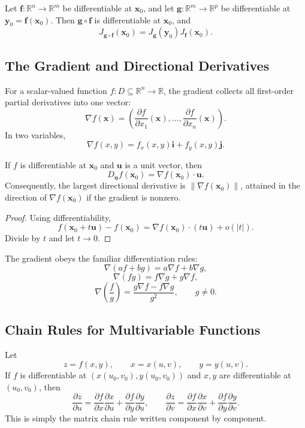 \begin{theorem}
Let $\mathbf{f}:\mathbb{R}^n\to\mathbb{R}^m$ be differentiable at $\mathbf{x}_0$, and let $\mathbf{g}:\mathbb{R}^m\to\mathbb{R}^p$ be differentiable at $\mathbf{y}_0=\mathbf{f}(\mathbf{x}_0)$. Then $\mathbf{g}\circ\mathbf{f}$ is differentiable at $\mathbf{x}_0$, and
\[
    J_{\mathbf{g}\circ\mathbf{f}}(\mathbf{x}_0)=J_{\mathbf{g}}(\mathbf{y}_0)J_{\mathbf{f}}(\mathbf{x}_0).
\]
\end{theorem}

\subsection{The Gradient and Directional Derivatives}

For a scalar-valued function $f:D\subseteq\mathbb{R}^n\to\mathbb{R}$, the gradient collects all first-order partial derivatives into one vector:
\[
    \nabla f(\mathbf{x})=
    \left(\frac{\partial f}{\partial x_1}(\mathbf{x}),\dots,
    \frac{\partial f}{\partial x_n}(\mathbf{x})\right).
\]
In two variables,
\[
    \nabla f(x,y)=f_x(x,y)\mathbf{i}+f_y(x,y)\mathbf{j}.
\]

\begin{theorem}
If $f$ is differentiable at $\mathbf{x}_0$ and $\mathbf{u}$ is a unit vector, then
\[
    D_{\mathbf{u}}f(\mathbf{x}_0)=\nabla f(\mathbf{x}_0)\cdot\mathbf{u}.
\]
Consequently, the largest directional derivative is $\|\nabla f(\mathbf{x}_0)\|$, attained in the direction of $\nabla f(\mathbf{x}_0)$ if the gradient is nonzero.
\end{theorem}

\begin{proof}
Using differentiability,
\[
    f(\mathbf{x}_0+t\mathbf{u})-f(\mathbf{x}_0)=\nabla f(\mathbf{x}_0)\cdot(t\mathbf{u})+o(|t|).
\]
Divide by $t$ and let $t\to0$.
\end{proof}

The gradient obeys the familiar differentiation rules:
\[
    \nabla(af+bg)=a\nabla f+b\nabla g,
\]
\[
    \nabla(fg)=f\nabla g+g\nabla f,
\]
\[
    \nabla\left(\frac{f}{g}\right)=\frac{g\nabla f-f\nabla g}{g^2},\qquad g\ne0.
\]

\subsection{Chain Rules for Multivariable Functions}

Let
\[
    z=f(x,y),\qquad x=x(u,v),\qquad y=y(u,v).
\]
If $f$ is differentiable at $(x(u_0,v_0),y(u_0,v_0))$ and $x,y$ are differentiable at $(u_0,v_0)$, then
\[
\frac{\partial z}{\partial u}=\frac{\partial f}{\partial x}\frac{\partial x}{\partial u}+\frac{\partial f}{\partial y}\frac{\partial y}{\partial u},
\qquad
\frac{\partial z}{\partial v}=\frac{\partial f}{\partial x}\frac{\partial x}{\partial v}+\frac{\partial f}{\partial y}\frac{\partial y}{\partial v}.
\]
This is simply the matrix chain rule written component by component.

